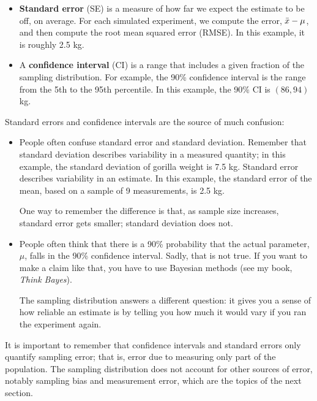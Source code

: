 \documentclass[12pt]{book}
\begin{document}
\begin{itemize}

\item {\bf Standard error} (SE) is a measure of how far we expect the
  estimate to be off, on average.  For each simulated experiment, we
  compute the error, $\bar{x} - \mu$, and then compute the root mean
  squared error (RMSE).  In this example, it is roughly 2.5 kg.

\item A {\bf confidence interval} (CI) is a range that includes a
  given fraction of the sampling distribution.  For example, the 90\%
  confidence interval is the range from the 5th to the 95th
  percentile.  In this example, the 90\% CI is $(86, 94)$ kg.

\end{itemize}

Standard errors and confidence intervals are the source of much confusion:

\begin{itemize}

\item People often confuse standard error and standard deviation.
  Remember that standard deviation describes variability in a measured
  quantity; in this example, the standard deviation of gorilla weight
  is 7.5 kg.  Standard error describes variability in an estimate.  In
  this example, the standard error of the mean, based on a sample of 9
  measurements, is 2.5 kg.

  One way to remember the difference is that, as sample size
  increases, standard error gets smaller; standard deviation does not.

\item People often think that there is a 90\% probability that the
  actual parameter, $\mu$, falls in the 90\% confidence interval.
  Sadly, that is not true.  If you want to make a claim like that, you
  have to use Bayesian methods (see my book, {\it Think Bayes\/}).

  The sampling distribution answers a different question: it gives you
  a sense of how reliable an estimate is by telling you how much it
  would vary if you ran the experiment again.

\end{itemize}

It is important to remember that confidence intervals
and standard errors only quantify sampling error; that is,
error due to measuring only part of the population.
The sampling distribution does not account for other
sources of error, notably sampling bias and measurement error, 
which are the topics of the next section.
\end{document}
